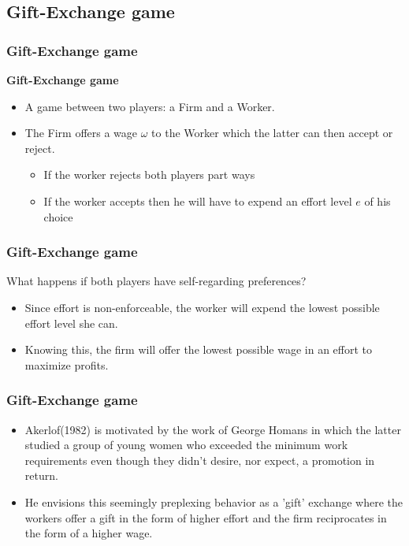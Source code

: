 \documentclass{beamer}
\begin{document}
\subsection{Gift-Exchange game}


\begin{frame}
	\frametitle{Gift-Exchange game}
	\textbf{Gift-Exchange game}
	\begin{itemize}
		\item A game between two players: a Firm and a Worker.
		\item The Firm offers a wage $\omega$ to the Worker which the latter can then accept or reject.
		\begin{itemize}
			\item If the worker rejects both players part ways
			\item If the worker accepts then he will have to expend an effort level $e$ of his choice
		\end{itemize}
	\end{itemize}
\end{frame}

\begin{frame}
	\frametitle{Gift-Exchange game}
	What happens if both players have self-regarding preferences?
	\begin{itemize}
		\item Since effort is non-enforceable, the worker will expend the lowest possible 	effort level she can.
		\item Knowing this, the firm will offer the lowest possible wage in an effort to maximize profits.
	\end{itemize}
	
\end{frame}

\begin{frame}
	\frametitle{Gift-Exchange game}
	\begin{itemize}
		\item Akerlof(1982) is motivated by the work of George Homans in which the latter studied a group of young women who exceeded the minimum work requirements even though they didn't desire, nor expect, a promotion in return.
		\item He envisions this seemingly preplexing behavior as a 'gift' exchange where the workers offer a gift in the form of higher effort and the firm reciprocates in the form of a higher wage.
	\end{itemize}
\end{frame}
\end{document}
